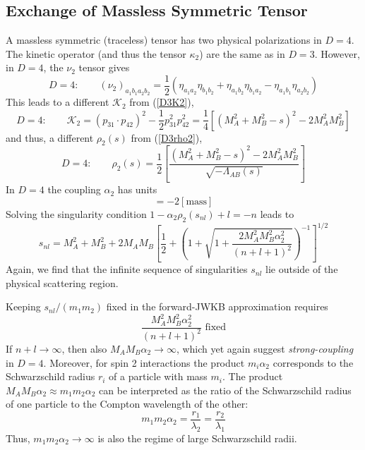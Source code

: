 \subsection{Exchange of Massless Symmetric Tensor}
A massless symmetric (traceless) tensor has two physical polarizations in $D = 4$. The kinetic operator (and thus the tensor $\kappa_{2}$) are the same as in $D = 3$. However, in $D = 4$, the $\nu_{2}$ tensor gives
\begin{equation}
	D = 4: \qquad (\nu_{2})_{a_{1}b_{1} a_{2} b_{2}} = \frac{1}{2} \left( \eta_{a_{1} a_{2}} \eta_{b_{1} b_{2}} + \eta_{a_{1}b_{2}} \eta_{b_{1}a_{2}} - \eta_{a_{1}b_{1}} \eta_{a_{2}b_{2}} \right)
\end{equation}
This leads to a different $\mathcal{K}_{2}$ from (\ref{D3K2}),
\begin{equation}
	D = 4: \qquad \mathcal{K}_{2} = (p_{31} \cdot p_{42})^{2} - \frac{1}{2} p_{31}^{2} p_{42}^{2} = \frac{1}{4} \left[ (M_{A}^{2} + M_{B}^{2} - s)^{2} - 2 M_{A}^{2} M_{B}^{2} \right]
\end{equation}
and thus, a different $\rho_{2}(s)$ from (\ref{D3rho2}),
\begin{equation}
	D = 4: \qquad \rho_{2}(s) = \frac{1}{2} \left[ \frac{(M_{A}^{2} + M_{B}^{2} - s)^{2} - 2 M_{A}^{2} M_{B}^{2}}{\sqrt{-\Lambda_{AB}(s)}} \right]
\end{equation}
In $D = 4$ the coupling $\alpha_{2}$ has units
\begin{equation}
	[\alpha_{2}] = -2 [\text{mass}]
\end{equation}
Solving the singularity condition $1 - \alpha_{2} \rho_{2}(s_{nl}) + l = -n$ leads to
\begin{equation}
	s_{nl} = M_{A}^{2} + M_{B}^{2} + 2M_{A}M_{B} \left[ \frac{1}{2} + \left(1 + \sqrt{1 + \frac{2 M_{A}^{2} M_{B}^{2} \alpha_{2}^{2}}{(n + l + 1)^{2}}} \right)^{-1} \right]^{1/2} \label{sJ2}
\end{equation}
Again, we find that the infinite sequence of singularities $s_{nl}$ lie outside of the physical scattering region.

Keeping $s_{nl}/(m_{1}m_{2})$ fixed in the forward-JWKB approximation requires
\begin{equation}
	\frac{M_{A}^{2} M_{B}^{2} \alpha_{2}^{2}}{(n + l + 1)^{2}} \text{ fixed}
\end{equation}
If $n + l \rightarrow \infty$, then also $M_{A} M_{B} \alpha_{2} \rightarrow \infty$, which yet again suggest \textit{strong-coupling} in $D = 4$. Moreover, for spin 2 interactions the product $m_{i} \alpha_{2}$ corresponds to the Schwarzschild radius $r_{i}$ of a particle with mass $m_{i}$. The product $M_{A} M_{B} \alpha_{2} \approx m_{1} m_{2} \alpha_{2}$ can be interpreted as the ratio of the Schwarzschild radius of one particle to the Compton wavelength of the other:
\begin{equation}
	m_{1} m_{2} \alpha_{2} = \frac{r_{1}}{\lambda_{2}} = \frac{r_{2}}{\lambda_{1}}
\end{equation}
Thus, $m_{1} m_{2} \alpha_{2} \rightarrow \infty$ is also the regime of large Schwarzschild radii.